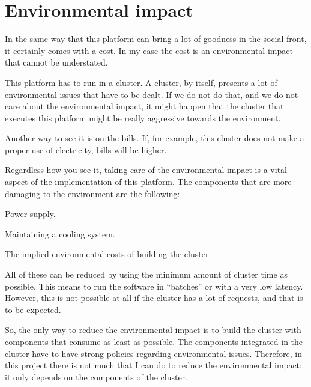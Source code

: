 
\section{Environmental impact}

In the same way that this platform can bring a lot of goodness in the social
front, it certainly comes with a cost. In my case the cost is an environmental
impact that cannot be understated.

This platform has to run in a cluster. A cluster, by itself, presents a lot of
environmental issues that have to be dealt. If we do not do that, and we do not
care about the environmental impact, it might happen that the cluster that
executes this platform might be really aggressive towards the environment.

Another way to see it is on the bills. If, for example, this cluster does not
make a proper use of electricity, bills will be higher.

Regardless how you see it, taking care of the environmental impact is a vital
aspect of the implementation of this platform. The components that are more
damaging to the environment are the following:

\mylist
  \item Power supply.
  \item Maintaining a cooling system.
  \item The implied environmental costs of building the cluster.
\mylistend

All of these can be reduced by using the minimum amount of cluster time as
possible. This means to run the software in ``batches'' or with a very low
latency. However, this is not possible at all if the cluster has a lot of
requests, and that is to be expected.

So, the only way to reduce the environmental impact is to build the cluster
with components that consume as least as possible. The components integrated in
the cluster have to have strong policies regarding environmental issues.
Therefore, in this project there is not much that I can do to reduce the
environmental impact: it only depends on the components of the cluster.
